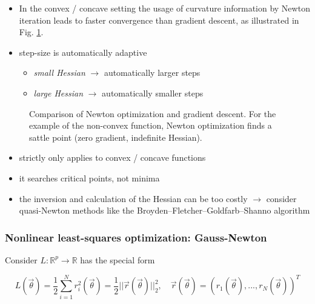 \begin{itemize}
    \item In the convex / concave setting the usage of curvature information
    by Newton iteration leads to faster convergence than gradient descent, as
    illustrated in Fig. \ref{fig:newton_vs_gd}.
    \item step-size is automatically adaptive
    \begin{itemize}
        \item \textit{small Hessian} $\rightarrow$ automatically larger steps
        \item \textit{large Hessian} $\rightarrow$ automatically smaller steps
    \end{itemize}
\end{itemize}

\begin{figure}[!htb]
    \centering
    
    \caption{Comparison of Newton optimization and gradient descent. For the example of the non-convex function,
    Newton optimization finds a sattle point (zero gradient, indefinite Hessian).}
    \label{fig:newton_vs_gd}
\end{figure}

\begin{itemize}
    \item strictly only applies to convex / concave functions
    \item it searches critical points, not minima
    \item the inversion and calculation of the Hessian can be too costly $\rightarrow$ consider quasi-Newton methods like the Broyden–Fletcher–Goldfarb–Shanno algorithm
\end{itemize}

\subsubsection{Nonlinear least-squares optimization: Gauss-Newton}


Consider $L: \mathbb{R}^p \to \mathbb{R}$ has the special form

\begin{equation}
    L(\vec{\theta}) = \frac{1}{2} \sum_{i=1}^{N} r_i^2(\vec{\theta}) = \frac{1}{2} ||\vec{r}(\vec{\theta})||_2^2, \quad \vec{r}(\vec{\theta}) = (r_1(\vec{\theta}),...,r_N(\vec{\theta}))^T
\end{equation}

